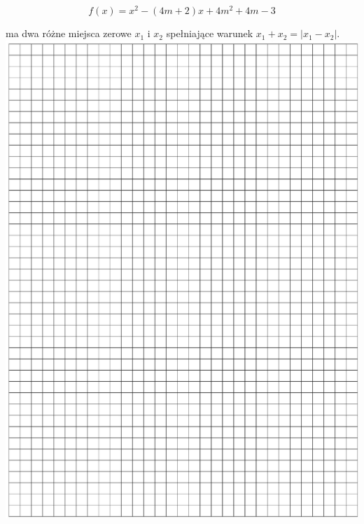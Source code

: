 \documentclass[10pt]{article}
\begin{document}
\[
f(x)=x^{2}-(4 m+2) x+4 m^{2}+4 m-3
\]

ma dwa różne miejsca zerowe \(x_{1}\) i \(x_{2}\) spełniające warunek \(x_{1}+x_{2}=\left|x_{1}-x_{2}\right|\).\\
\includegraphics[max width=\textwidth, center]{2024_11_21_5229b9d0453456f1828dg-10}\\
\end{document}
